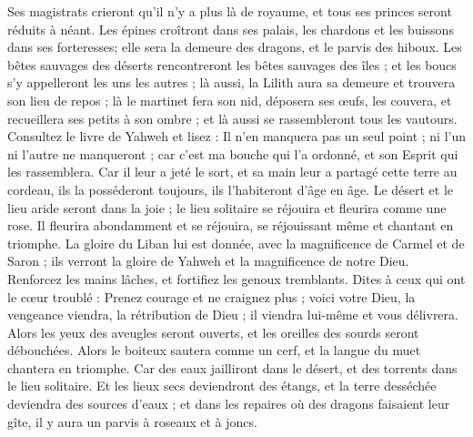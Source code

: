 \begin{multicols}{2}
Ses magistrats crieront qu'il n'y a plus là de royaume, et tous ses princes seront réduits à néant.
Les épines croîtront dans ses palais, les chardons et les buissons dans ses forteresses; elle sera la demeure des dragons, et le parvis des hiboux.
Les bêtes sauvages des déserts rencontreront les bêtes sauvages des îles ; et les boucs s'y appelleront les uns les autres ; là aussi, la Lilith aura sa demeure et trouvera son lieu de repos ;
là le martinet fera son nid, déposera ses œufs, les couvera, et recueillera ses petits à son ombre ; et là aussi se rassembleront tous les vautours.
Consultez le livre de Yahweh et lisez : Il n'en manquera pas un seul point ; ni l'un ni l'autre ne manqueront ; car c'est ma bouche qui l'a ordonné, et son Esprit qui les rassemblera.
Car il leur a jeté le sort, et sa main leur a partagé cette terre au cordeau, ils la posséderont toujours, ils l'habiteront d'âge en âge.
\VerseOne{}Le désert et le lieu aride seront dans la joie ; le lieu solitaire se réjouira et fleurira comme une rose.
Il fleurira abondamment et se réjouira, se réjouissant même et chantant en triomphe. La gloire du Liban lui est donnée, avec la magnificence de Carmel et de Saron ; ils verront la gloire de Yahweh et la magnificence de notre Dieu.
Renforcez les mains lâches, et fortifiez les genoux tremblants.
Dites à ceux qui ont le cœur troublé : Prenez courage et ne craignez plus ; voici votre Dieu, la vengeance viendra, la rétribution de Dieu ; il viendra lui-même et vous délivrera.
Alors les yeux des aveugles seront ouverts, et les oreilles des sourds seront débouchées.
Alors le boiteux sautera comme un cerf, et la langue du muet chantera en triomphe. Car des eaux jailliront dans le désert, et des torrents dans le lieu solitaire.
Et les lieux secs deviendront des étangs, et la terre desséchée deviendra des sources d'eaux ; et dans les repaires où des dragons faisaient leur gîte, il y aura un parvis à roseaux et à joncs.

\end{multicols}
